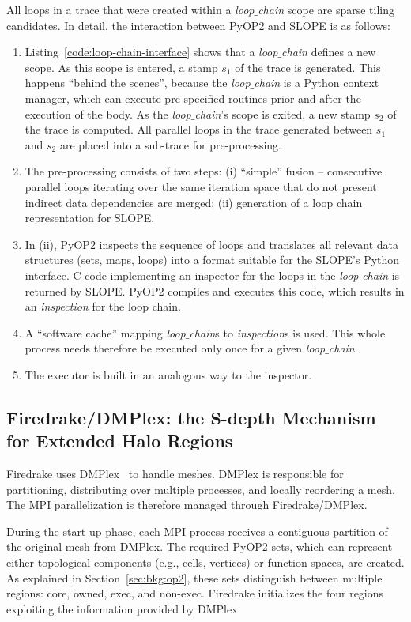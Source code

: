 All loops in a trace that were created within a {\em loop$\_$chain} scope are sparse tiling candidates. In detail, the interaction between PyOP2 and SLOPE is as follows:
\begin{enumerate}
\item Listing~\ref{code:loop-chain-interface} shows that a {\em loop$\_$chain} defines a new scope. As this scope is entered, a stamp $s_1$ of the trace is generated. This happens ``behind the scenes'', because the {\em loop$\_$chain} is a Python context manager, which can execute pre-specified routines prior and after the execution of the body. As the {\em loop$\_$chain}'s scope is exited, a new stamp $s_2$ of the trace is computed. All parallel loops in the trace generated between $s_1$ and $s_2$ are placed into a sub-trace for pre-processing.
\item The pre-processing consists of two steps: (i) ``simple'' fusion -- consecutive parallel loops iterating over the same iteration space that do not present indirect data dependencies are merged; (ii) generation of a loop chain representation for SLOPE.
\item In (ii), PyOP2 inspects the sequence of loops and translates all relevant data structures (sets, maps, loops) into a format suitable for the SLOPE's Python interface. C code implementing an inspector for the loops in the {\em loop$\_$chain} is returned by SLOPE. PyOP2 compiles and executes this code, which results in an {\em inspection} for the loop chain.
\item A ``software cache'' mapping {\em loop$\_$chain}s to {\em inspection}s is used. This whole process needs therefore be executed only once for a given {\em loop$\_$chain}. 
\item The executor is built in an analogous way to the inspector.
\end{enumerate}


\subsection{Firedrake/DMPlex: the S-depth Mechanism for Extended Halo Regions}
\label{sec:tiling:impl-firedrake}
Firedrake uses DMPlex~\citep{dmplex-cite} to handle meshes. DMPlex is responsible for partitioning, distributing over multiple processes, and locally reordering a mesh. The MPI parallelization is therefore managed through Firedrake/DMPlex.

During the start-up phase, each MPI process receives a contiguous partition of the original mesh from DMPlex. The required PyOP2 sets, which can represent either topological components (e.g., cells, vertices) or function spaces, are created. As explained in Section~\ref{sec:bkg:op2}, these sets distinguish between multiple regions: core, owned, exec, and non-exec. Firedrake initializes the four regions exploiting the information provided by DMPlex. 

